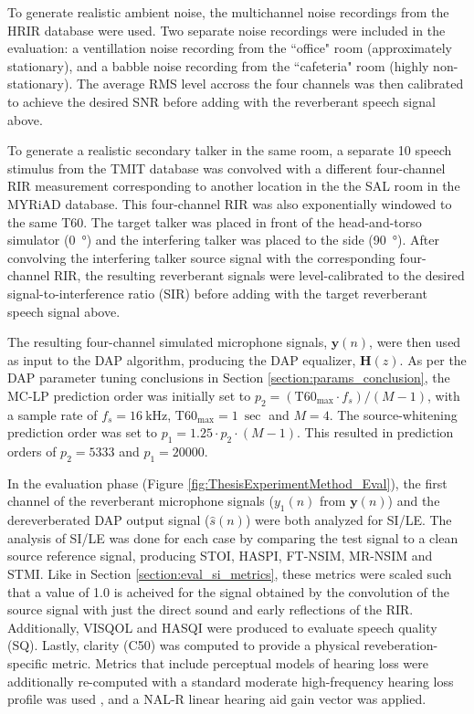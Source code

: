 To generate realistic ambient noise, the multichannel noise recordings from the HRIR database were used. Two separate noise recordings were included in the evaluation: a ventillation noise recording from the ``office" room (approximately stationary), and a babble noise recording from the ``cafeteria" room (highly non-stationary). The average RMS level accross the four channels was then calibrated to achieve the desired SNR before adding with the reverberant speech signal above.

To generate a realistic secondary talker in the same room, a separate \qty{10}{\sec} speech stimulus from the TMIT database was convolved with a different four-channel RIR measurement corresponding to another location in the the SAL room in the MYRiAD database. This four-channel RIR was also exponentially windowed to the same T60. The target talker was placed in front of the head-and-torso simulator (\qty{0}{\degree}) and the interfering talker was placed to the side (\qty{90}{\degree}). After convolving the interfering talker source signal with the corresponding four-channel RIR, the resulting reverberant signals were level-calibrated to the desired signal-to-interference ratio (SIR) before adding with the target reverberant speech signal above.

The resulting four-channel simulated microphone signals, $\boldsymbol{y}(n)$, were then used as input to the DAP algorithm, producing the DAP equalizer, $\boldsymbol{H}(z)$. As per the DAP parameter tuning conclusions in Section \ref{section:params_conclusion}, the MC-LP prediction order was initially set to $p_2=\left(\mathrm{T60}_{\mathrm{max}} \cdot f_s \right)/\left(M-1\right)$, with a sample rate of $f_s = \qty{16}{\kilo\hertz}$, $\mathrm{T60}_{\mathrm{max}} = \qty{1}{\sec}$ and $M=4$. The source-whitening prediction order was set to $p_1 = 1.25 \cdot p_2 \cdot \left(M-1\right)$. This resulted in prediction orders of $p_2 = 5333$ and $p_1 = 20000$.

In the evaluation phase (Figure \ref{fig:ThesisExperimentMethod_Eval}), the first channel of the reverberant microphone signals ($y_1(n)$ from $\boldsymbol{y}(n)$) and the dereverberated DAP output signal ($\hat{s}(n)$) were both analyzed for SI/LE. The analysis of SI/LE was done for each case by comparing the test signal to a clean source reference signal, producing STOI, HASPI, FT-NSIM, MR-NSIM and STMI. Like in Section \ref{section:eval_si_metrics}, these metrics were scaled such that a value of 1.0 is acheived for the signal obtained by the convolution of the source signal with just the direct sound and early reflections of the RIR. Additionally, VISQOL and HASQI were produced to evaluate speech quality (SQ). Lastly, clarity (C50) was computed to provide a physical reveberation-specific metric. Metrics that include perceptual models of hearing loss were additionally re-computed with a standard moderate high-frequency hearing loss profile was used \citep[IEC 60118-15 moderate hearing loss, moderately sloping group, ][]{bisgaard2010standard}, and a NAL-R linear hearing aid gain vector was applied.

